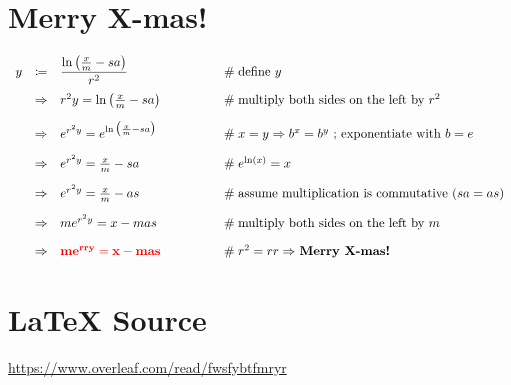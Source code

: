 \documentclass{article}
\theoremstyle{definition}
\begin{document}
\section{Merry X-mas!}
\bigskip
\large {
  \begin{equation*}
   \begin{array}{rcll} 
		y
		&\coloneqq& {\displaystyle \frac{\ln \big (\frac{x}{m} -  sa  \big ) }{r^2}}                                            
				&\qquad \qquad \mathrel{\#} \text{define $y$} \\
[10pt]
		&\Rightarrow& r^2 y = \ln \big (\frac{x}{m} -  sa  \big )    
				&\qquad \qquad  \mathrel{\#} \text{multiply both sides on the left by $r^2$} \\
[10pt]
		&\Rightarrow& e^{r^2y} = e^{\ln \big ( \frac{x}{m} -  sa\big )}                           
				&\qquad \qquad \mathrel{\#} \text{$x = y \Rightarrow b^x =b^y$ ; exponentiate with $b = e$} \\
[10pt]
		&\Rightarrow& e^{r^2y} = \frac{x}{m} -  sa                           
				&\qquad \qquad \mathrel{\#} e^{\ln(x)} = x \\
[10pt]
		&\Rightarrow& e^{r^2y} = \frac{x}{m} -  as						
				&\qquad \qquad \mathrel{\#} \text{assume multiplication is commutative $(sa = as)$} \\ 
[10pt]
		&\Rightarrow& m e^{r^2y} = x - mas                                        
				&\qquad \qquad \mathrel{\#} \text{multiply both sides on the left by $m$} \\
[10pt]
		&\Rightarrow& \bf{\color{red}{m e^{rry} = x - mas}}                                     
				&\qquad \qquad \mathrel{\#} \text{$r^2 = rr \Rightarrow$ \bf{Merry X-mas!}}
    \end{array}
   \end{equation*}
}


%
%
%
%
%
\section*{\LaTeX \hspace{0.10 mm} Source}
\url{https://www.overleaf.com/read/fwsfybtfmryr}
%
%
%


%
%
\end{document}
